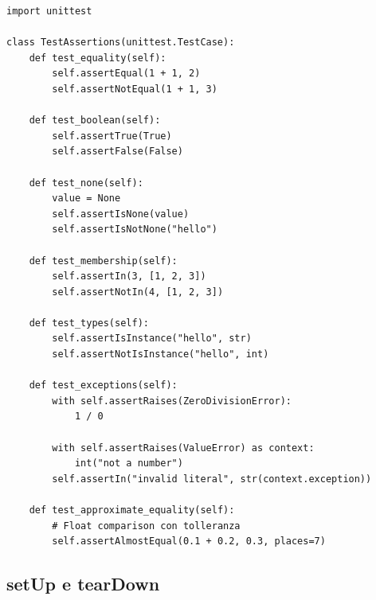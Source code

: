 \begin{lstlisting}
import unittest

class TestAssertions(unittest.TestCase):
    def test_equality(self):
        self.assertEqual(1 + 1, 2)
        self.assertNotEqual(1 + 1, 3)

    def test_boolean(self):
        self.assertTrue(True)
        self.assertFalse(False)

    def test_none(self):
        value = None
        self.assertIsNone(value)
        self.assertIsNotNone("hello")

    def test_membership(self):
        self.assertIn(3, [1, 2, 3])
        self.assertNotIn(4, [1, 2, 3])

    def test_types(self):
        self.assertIsInstance("hello", str)
        self.assertNotIsInstance("hello", int)

    def test_exceptions(self):
        with self.assertRaises(ZeroDivisionError):
            1 / 0

        with self.assertRaises(ValueError) as context:
            int("not a number")
        self.assertIn("invalid literal", str(context.exception))

    def test_approximate_equality(self):
        # Float comparison con tolleranza
        self.assertAlmostEqual(0.1 + 0.2, 0.3, places=7)
\end{lstlisting}

\subsection{setUp e tearDown}

